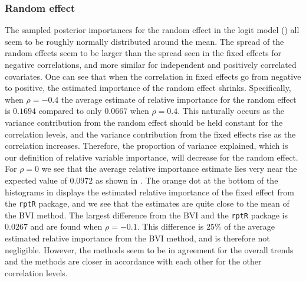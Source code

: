 \subsubsection{Random effect}
The sampled posterior importances for the random effect in the logit model () all seem to be roughly normally distributed around the mean. The spread of the random effects seem to be larger than the spread seen in the fixed effects for negative correlations, and more similar for independent and positively correlated covariates. One can see that when the correlation in fixed effects go from negative to positive, the estimated importance of the random effect shrinks. Specifically, when $\rho=-0.4$ the average estimate of relative importance for the random effect is $0.1694$ compared to only $0.0667$ when $\rho=0.4$. This naturally occurs as the variance contribution from the random effect should be held constant for the correlation levels, and the variance contribution from the fixed effects rise as the correlation increases. Therefore, the proportion of variance explained, which is our definition of relative variable importance, will decrease for the random effect. For $\rho=0$ we see that the average relative importance estimate lies very near the expected value of $0.0972$ as shown in . The orange dot at the bottom of the histograms in  displays the estimated relative importance of the fixed effect from the \texttt{rptR} package, and we see that the estimates are quite close to the mean of the BVI method. The largest difference from the BVI and the \texttt{rptR} package is $0.0267$ and are found when $\rho=-0.1$. This difference is $25\%$ of the average estimated relative importance from the BVI method, and is therefore not negligible. However, the methods seem to be in agreement for the overall trends and the methods are closer in accordance with each other for the other correlation levels.
\\
\\
